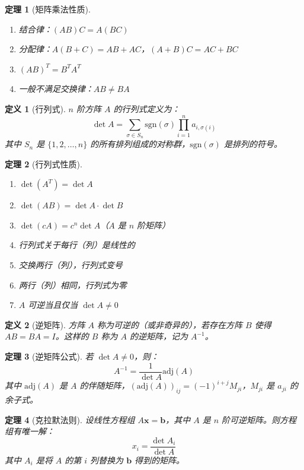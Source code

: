 \documentclass[12pt]{article}
\newtheorem{theorem}{定理}[section]
\newtheorem{definition}{定义}[section]
\begin{document}
\begin{theorem}[矩阵乘法性质]
\begin{enumerate}
\item 结合律：$(AB)C = A(BC)$
\item 分配律：$A(B + C) = AB + AC$，$(A + B)C = AC + BC$
\item $(AB)^T = B^T A^T$
\item 一般不满足交换律：$AB \neq BA$
\end{enumerate}
\end{theorem}

\begin{definition}[行列式]
$n$ 阶方阵 $A$ 的行列式定义为：
$$\det A = \sum_{\sigma \in S_n} \text{sgn}(\sigma) \prod_{i=1}^{n} a_{i,\sigma(i)}$$
其中 $S_n$ 是 $\{1, 2, \ldots, n\}$ 的所有排列组成的对称群，$\text{sgn}(\sigma)$ 是排列的符号。
\end{definition}

\begin{theorem}[行列式性质]
\begin{enumerate}
\item $\det(A^T) = \det A$
\item $\det(AB) = \det A \cdot \det B$
\item $\det(cA) = c^n \det A$（$A$ 是 $n$ 阶矩阵）
\item 行列式关于每行（列）是线性的
\item 交换两行（列），行列式变号
\item 两行（列）相同，行列式为零
\item $A$ 可逆当且仅当 $\det A \neq 0$
\end{enumerate}
\end{theorem}

\begin{definition}[逆矩阵]
方阵 $A$ 称为可逆的（或非奇异的），若存在方阵 $B$ 使得 $AB = BA = I$。这样的 $B$ 称为 $A$ 的逆矩阵，记为 $A^{-1}$。
\end{definition}

\begin{theorem}[逆矩阵公式]
若 $\det A \neq 0$，则：
$$A^{-1} = \frac{1}{\det A} \text{adj}(A)$$
其中 $\text{adj}(A)$ 是 $A$ 的伴随矩阵，$(\text{adj}(A))_{ij} = (-1)^{i+j} M_{ji}$，$M_{ji}$ 是 $a_{ji}$ 的余子式。
\end{theorem}

\begin{theorem}[克拉默法则]
设线性方程组 $A\mathbf{x} = \mathbf{b}$，其中 $A$ 是 $n$ 阶可逆矩阵。则方程组有唯一解：
$$x_i = \frac{\det A_i}{\det A}$$
其中 $A_i$ 是将 $A$ 的第 $i$ 列替换为 $\mathbf{b}$ 得到的矩阵。
\end{theorem}
\end{document}

